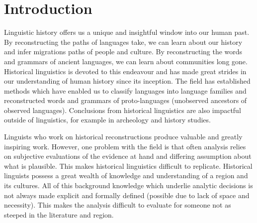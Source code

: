 \documentclass[a4paper,10pt]{article} %
\begin{document}
\begin{abstract}
\end{abstract}
\newpage

\doublespacing
\section{Introduction}
\label{acr:intro}
Linguistic history offers us a unique and insightful window into our human past. By reconstructing the paths of languages take, we can learn about our history and infer migrations paths of people and culture. By reconstructing the words and grammars of ancient languages, we can learn about communities long gone. Historical linguistics is devoted to this endeavour and has made great strides in our understanding of human history since its inception. The field has established methods which have enabled us to classify languages into language families and reconstructed words and grammars of proto-languages (unobserved ancestors of observed languages). Conclusions from historical linguistics are also impactful outside of linguistics, for example in archeology and history studies.

Linguists who work on historical reconstructions produce valuable and greatly inspiring work. However, one problem with the field is that often analysis relies on subjective evaluations of the evidence at hand and differing assumption about what is plausible. This makes historical linguistics difficult to replicate. Historical linguists possess a great wealth of knowledge and understanding of a region and its cultures. All of this background knowledge which underlie analytic decisions is not always made explicit and formally defined (possible due to lack of space and necessity). This makes the analysis difficult to evaluate for someone not as steeped in the literature and region.
\end{document}
